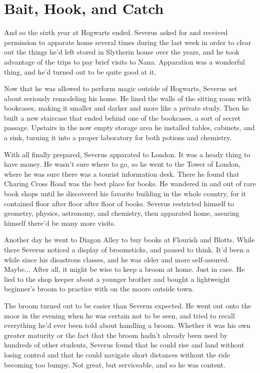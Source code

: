 
\chapter{Bait, Hook, and Catch}


And so the sixth year at Hogwarts ended. Severus asked for and received permission to apparate home several times during the last week in order to clear out the things he'd left stored in Slytherin house over the years, and he took advantage of the trips to pay brief visits to Nana. Apparation was a wonderful thing, and he'd turned out to be quite good at it.

Now that he was allowed to perform magic outside of Hogwarts, Severus set about seriously remodeling his home. He lined the walls of the sitting room with bookcases, making it smaller and darker and more like a private study. Then he built a new staircase that ended behind one of the bookcases, a sort of secret passage. Upstairs in the now empty storage area he installed tables, cabinets, and a sink, turning it into a proper laboratory for both potions and chemistry.

With all finally prepared, Severus apparated to London. It was a heady thing to have money. He wasn't sure where to go, so he went to the Tower of London, where he was sure there was a tourist information desk. There he found that Charing Cross Road was the best place for books. He wandered in and out of rare book shops until he discovered his favorite building in the whole country, for it contained floor after floor after floor of books. Severus restricted himself to geometry, physics, astronomy, and chemistry, then apparated home, assuring himself there'd be many more visits.

Another day he went to Diagon Alley to buy books at Flourish and Blotts. While there Severus noticed a display of broomsticks, and paused to think. It'd been a while since his disastrous classes, and he was older and more self-assured. Maybe... After all, it might be wise to keep a broom at home. Just in case. He lied to the shop keeper about a younger brother and bought a lightweight beginner's broom to practice with on the moors outside town.

The broom turned out to be easier than Severus expected. He went out onto the moor in the evening when he was certain not to be seen, and tried to recall everything he'd ever been told about handling a broom. Whether it was his own greater maturity or the fact that the broom hadn't already been used by hundreds of other students, Severus found that he could rise and land without losing control and that he could navigate short distances without the ride becoming too bumpy. Not great, but serviceable, and so he was content.

